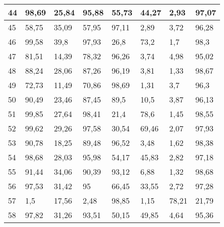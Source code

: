 \begin{longtable}[c]{|l|l|l|l|l|l|l|l|}
44              & 98,69        & 25,84        & 95,88       & 55,73         & 44,27         & 2,93          & 97,07         \\ \hline
45              & 58,75        & 35,09        & 57,95       & 97,11         & 2,89          & 3,72          & 96,28         \\ \hline
46              & 99,58        & 39,8         & 97,93       & 26,8          & 73,2          & 1,7           & 98,3          \\ \hline
47              & 81,51        & 14,39        & 78,32       & 96,26         & 3,74          & 4,98          & 95,02         \\ \hline
48              & 88,24        & 28,06        & 87,26       & 96,19         & 3,81          & 1,33          & 98,67         \\ \hline
49              & 72,73        & 11,49        & 70,86       & 98,69         & 1,31          & 3,7           & 96,3          \\ \hline
50              & 90,49        & 23,46        & 87,45       & 89,5          & 10,5          & 3,87          & 96,13         \\ \hline
51              & 99,85        & 27,64        & 98,41       & 21,4          & 78,6          & 1,45          & 98,55         \\ \hline
52              & 99,62        & 29,26        & 97,58       & 30,54         & 69,46         & 2,07          & 97,93         \\ \hline
53              & 90,78        & 18,25        & 89,48       & 96,52         & 3,48          & 1,62          & 98,38         \\ \hline
54              & 98,68        & 28,03        & 95,98       & 54,17         & 45,83         & 2,82          & 97,18         \\ \hline
55              & 91,44        & 34,06        & 90,39       & 93,12         & 6,88          & 1,32          & 98,68         \\ \hline
56              & 97,53        & 31,42        & 95          & 66,45         & 33,55         & 2,72          & 97,28         \\ \hline
57              & 1,5          & 17,56        & 2,48        & 98,85         & 1,15          & 78,21         & 21,79         \\ \hline
58              & 97,82        & 31,26        & 93,51       & 50,15         & 49,85         & 4,64          & 95,36         \\ \hline

\end{longtable}
